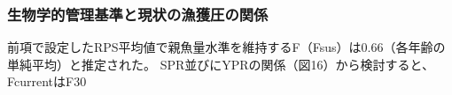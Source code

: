 \subsubsection{生物学的管理基準と現状の漁獲圧の関係}
 前項で設定したRPS平均値で親魚量水準を維持するF（Fsus）は0.66（各年齢の単純平均）と推定された。
SPR並びにYPRの関係（図16）から検討すると、FcurrentはF30%


